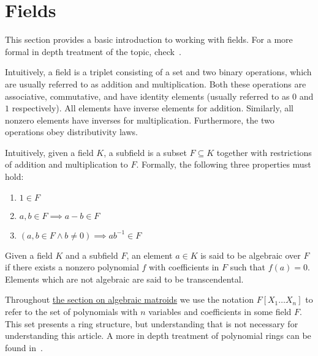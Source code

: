 \newpage
\section{Fields}\label{sec:appendix-fields}

This section provides a basic introduction to working with fields. For a more formal in depth treatment of the topic, check~\cite{milne2022}.

\begin{defn}[Fields]
  Intuitively, a field is a triplet consisting of a set and two binary operations, which are usually referred to as addition and multiplication. Both these operations are associative, commutative, and have identity elements (usually referred to as $0$ and $1$ respectively). All elements have inverse elements for addition. Similarly, all nonzero elements have inverses for multiplication. Furthermore, the two operations obey distributivity laws.
\end{defn}

\begin{defn}[Subfields]
  Intuitively, given a field $K$, a subfield is a subset $F \subseteq K$ together with restrictions of addition and multiplication to $F$. Formally, the following three properties must hold:
  \begin{enumerate}
    \item $1 \in F$
    \item $a, b \in F \implies a - b \in F$
    \item $(a, b \in F \land b \neq 0) \implies a b ^{-1}  \in F$
  \end{enumerate}
\end{defn}

\begin{defn}
  Given a field $K$ and a subfield $F$, an element $a \in K$ is said to be algebraic over $F$ if there exists a nonzero polynomial $f$ with coefficients in $F$ such that $f(a) = 0$. Elements which are not algebraic are said to be transcendental.
\end{defn}


Throughout \hyperref[sec:algebraic-matroids]{the section on algebraic matroids} we use the notation $F[X _1 \ldots X_n]$ to refer to the set of polynomials with $n$ variables and coefficients in some field $F$. This set presents a ring structure, but understanding that is not necessary for understanding this article. A more in depth treatment of polynomial rings can be found in~\cite{milne2022}.


